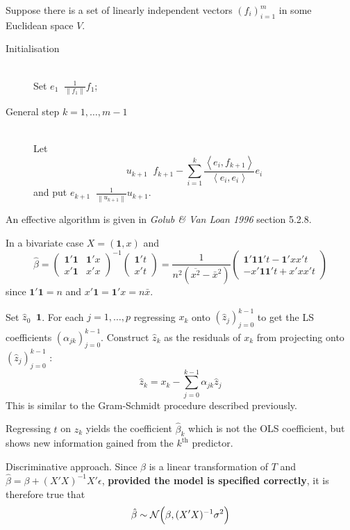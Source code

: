 \documentclass[a4paper]{article}
\newcommand{\brac}[1]{{\left ( #1 \right )}}
\newcommand{\nrm}[1]{{\left\| #1 \right \|}}
\newcommand{\brkt}[1]{{\left\langle #1 \right\rangle}}
\newcommand{\Ncal}{\mathcal{N}}
\newcommand{\one}{\mathbf{1}}
\newcommand{\defn}{\mathop{\overset{\Delta}{=}}\nolimits}
\begin{document}
Suppose there is a set of linearly independent vectors $\brac{f_i}_{i=1}^m$ in
some Euclidean space $V$.
\begin{description}
	\item[Initialisation] \hfill \\
		Set $e_1 \defn \frac{1}{\nrm{f_1}} f_1$;
	\item[General step $k=1,\ldots,m-1$] \hfill \\
		Let \[u_{k+1} \defn f_{k+1} - \sum_{i=1}^k \frac{\brkt{e_i, f_{k+1}}}{\brkt{e_i,e_i}} e_i\]
		and put $e_{k+1}\defn \frac{1}{\nrm{u_{k+1}}} u_{k+1}$.
\end{description}
An effective algorithm is given in \emph{Golub \& Van Loan 1996} section 5.2.8.


In a bivariate case $X = (\one,x)$ and
\[\hat{\beta} = \brac{\begin{matrix} \one'\one & \one'x\\ x'\one & x'x \end{matrix}}^{-1} \brac{\begin{matrix} \one't \\ x't \end{matrix}}
= \frac{1}{n^2 \brac{\overline{x^2} - \bar{x}^2}} \brac{\begin{matrix} \one'\one \one't - \one'x x't \\ - x'\one \one't + x'x x't \end{matrix}}
\]
since $\one'\one = n$ and $x'\one = \one'x = n\bar{x}$.


Set $\hat{z}_0 \defn \one$. For each $j=1,\ldots,p$ regressing $x_k$ onto
$\brac{\hat{z}_j}_{j=0}^{k-1}$ to get the LS coefficients $\brac{\alpha_{jk}}_{j=0}^{k-1}$.
Construct $\hat{z}_k$ as the residuals of $x_k$ from projecting onto $\brac{\hat{z}_j}_{j=0}^{k-1}$ :
\[\hat{z}_k = x_k - \sum_{j=0}^{k-1} \alpha_{jk} \hat{z}_j\]
This is similar to the Gram-Schmidt procedure described previously.

Regressing $t$ on $z_k$ yields the coefficient $\hat{\beta}_k$ which is not the
OLS coefficient, but shows new information gained from the $k^\text{th}$ predictor.

Discriminative approach.
Since $\hat{\beta}$ is a linear transformation of $T$ and $\hat{\beta} = \beta + (X'X)^{-1}X'\epsilon$,
\textbf{provided the model is specified correctly}, it is therefore true that
\[\hat{\beta}\sim\Ncal\Bigl(\beta,(X'X)^{-1} \sigma^2\Bigr)\]
\end{document}
